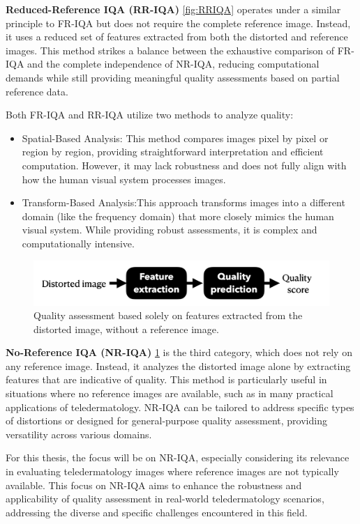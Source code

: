 \textbf{Reduced-Reference IQA (RR-IQA)} \ref{fig:RRIQA} operates under a similar principle to FR-IQA but does not require the complete reference image. Instead, it uses a reduced set of features extracted from both the distorted and reference images. This method strikes a balance between the exhaustive comparison of FR-IQA and the complete independence of NR-IQA, reducing computational demands while still providing meaningful quality assessments based on partial reference data. \par
\vspace{\baselineskip}
Both FR-IQA and RR-IQA utilize two methods to analyze quality:
\begin{itemize}
    \item Spatial-Based Analysis: This method compares images pixel by pixel or region by region, providing straightforward interpretation and efficient computation. However, it may lack robustness and does not fully align with how the human visual system processes images.
    \item Transform-Based Analysis:This approach transforms images into a different domain (like the frequency domain) that more closely mimics the human visual system. While providing robust assessments, it is complex and computationally intensive.
\end{itemize}
\vspace{\baselineskip}
\begin{figure}[ht]
    \centering
    \includegraphics[keepaspectratio,width=15cm]{img/NRIQA.png}
    \caption{Quality assessment based solely on features extracted from the distorted image, without a reference image.}
    \label{fig:NRIQA}
\end{figure}

\textbf{No-Reference IQA (NR-IQA)} \ref{fig:NRIQA} is the third category, which does not rely on any reference image. Instead, it analyzes the distorted image alone by extracting features that are indicative of quality. This method is particularly useful in situations where no reference images are available, such as in many practical applications of teledermatology. NR-IQA can be tailored to address specific types of distortions or designed for general-purpose quality assessment, providing versatility across various domains. \par
\vspace{\baselineskip}
For this thesis, the focus will be on NR-IQA, especially considering its relevance in evaluating teledermatology images where reference images are not typically available. This focus on NR-IQA aims to enhance the robustness and applicability of quality assessment in real-world teledermatology scenarios, addressing the diverse and specific challenges encountered in this field.

